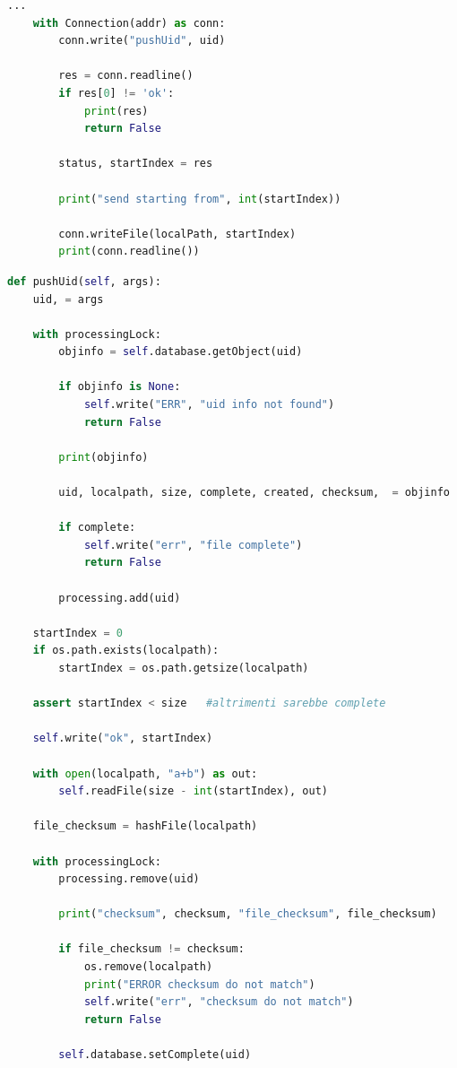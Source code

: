 \documentclass[11pt,a4paper,english]{article}
\begin{document}
\begin{lstlisting}[language=Python, title=Client]
    ...
    with Connection(addr) as conn:
        conn.write("pushUid", uid)

        res = conn.readline()
        if res[0] != 'ok':
            print(res)
            return False

        status, startIndex = res

        print("send starting from", int(startIndex))

        conn.writeFile(localPath, startIndex)
        print(conn.readline())
\end{lstlisting}

\begin{lstlisting}[language=Python, title=Dataserver]
def pushUid(self, args):
    uid, = args

    with processingLock:
        objinfo = self.database.getObject(uid)

        if objinfo is None:
            self.write("ERR", "uid info not found")
            return False

        print(objinfo)

        uid, localpath, size, complete, created, checksum,  = objinfo

        if complete:
            self.write("err", "file complete")
            return False

        processing.add(uid)

    startIndex = 0
    if os.path.exists(localpath):
        startIndex = os.path.getsize(localpath)

    assert startIndex < size   #altrimenti sarebbe complete

    self.write("ok", startIndex)

    with open(localpath, "a+b") as out:
        self.readFile(size - int(startIndex), out)

    file_checksum = hashFile(localpath)

    with processingLock:
        processing.remove(uid)

        print("checksum", checksum, "file_checksum", file_checksum)

        if file_checksum != checksum:
            os.remove(localpath)
            print("ERROR checksum do not match")
            self.write("err", "checksum do not match")
            return False

        self.database.setComplete(uid)
\end{lstlisting}
\end{document}
